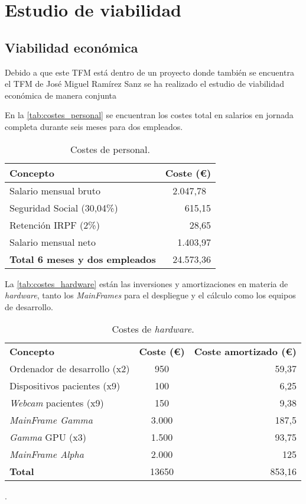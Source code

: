 \section{Estudio de viabilidad}


\subsection{Viabilidad económica}

Debido a que este TFM está dentro de un proyecto donde también se encuentra el TFM de José Miguel Ramírez Sanz se ha realizado el estudio de viabilidad económica de manera conjunta


En la \autoref{tab:costes_personal} se encuentran los costes total en salarios en jornada completa durante seis meses para dos empleados.

\begin{table}\centering
	\begin{tabular}[]{@{}l r@{}}
		\toprule
		\textbf{Concepto} & \textbf{Coste (\euro{})} \\
		\midrule
		Salario mensual bruto & 2.047,78~\cite{salariales} \\
		Seguridad Social (30,04\%) & 615,15 \\
		Retención IRPF (2\%) & 28,65 \\
		Salario mensual neto & 1.403,97 \\\hubu
		\textbf{Total 6 meses y dos empleados} &  24.573,36 \\
		\bottomrule
	\end{tabular}
	\caption{Costes de personal.}
	\label{tab:costes_personal}
\end{table}

La \autoref{tab:costes_hardware} están las inversiones y amortizaciones  en materia de \textit{hardware}, tanto los \textit{MainFrames} para el despliegue y el cálculo como los equipos de desarrollo.


\begin{table}
	\centering
	\begin{tabular}[]{@{}l c r@{}}
		\toprule
		\textbf{Concepto} & \textbf{Coste (\euro{})} & \textbf{Coste amortizado (\euro{})} \\
		\otoprule
		Ordenador de desarrollo (x2) & 950 &  59,37\\
		Dispositivos pacientes (x9) & 100 & 6,25\\
		\textit{Webcam} pacientes (x9) & 150 &9,38\\
		\textit{MainFrame Gamma}  & 3.000 & 187,5 \\ 
		\textit{Gamma} GPU (x3) & 1.500 &  93,75\\
		\textit{MainFrame Alpha}  & 2.000 & 125 \\\hubu
		\textbf{Total} & 13650 & 853,16\\
		\bottomrule
	\end{tabular}
	\caption{Costes de \textit{hardware}.}
	\label{tab:costes_hardware}.
\end{table}

